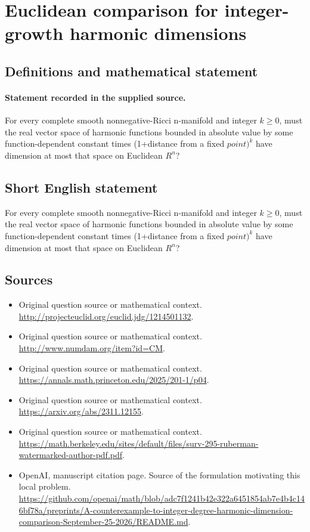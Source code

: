 \documentclass[11pt]{article}
\begin{document}
\section*{Euclidean comparison for integer-growth harmonic dimensions}\label{statement}
\subsection{Definitions and mathematical statement}
\paragraph{Statement recorded in the supplied source.}
For every complete smooth nonnegative-Ricci n-manifold and integer $k\geq 0$, must the real vector space of harmonic functions bounded in absolute value by some function-dependent constant times (1+distance from a fixed $point)^k$ have dimension at most that space on Euclidean $R^{n}$?
\subsection{Short English statement}
For every complete smooth nonnegative-Ricci n-manifold and integer $k\geq 0$, must the real vector space of harmonic functions bounded in absolute value by some function-dependent constant times (1+distance from a fixed $point)^k$ have dimension at most that space on Euclidean $R^{n}$?
\subsection{Sources}
\begin{itemize}
\item[S1] Original question source or mathematical context.
\url{http://projecteuclid.org/euclid.jdg/1214501132}.
\item[S2] Original question source or mathematical context.
\url{http://www.numdam.org/item?id=CM}.
\item[S3] Original question source or mathematical context.
\url{https://annals.math.princeton.edu/2025/201-1/p04}.
\item[S4] Original question source or mathematical context.
\url{https://arxiv.org/abs/2311.12155}.
\item[S5] Original question source or mathematical context.
\url{https://math.berkeley.edu/sites/default/files/surv-295-ruberman-watermarked-author-pdf.pdf}.
\item[S6] OpenAI, manuscript citation page. Source of the formulation motivating this local problem.
\url{https://github.com/openai/math/blob/adc7f1241b42e322a6451854ab7e4b4c146bf78a/preprints/A-counterexample-to-integer-degree-harmonic-dimension-comparison-September-25-2026/README.md}.
\end{itemize}
\end{document}
